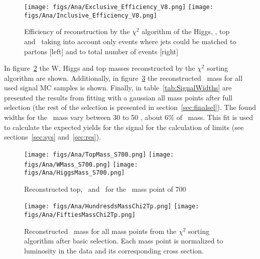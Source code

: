\begin{figure}[!Hhtbp]
  \begin{center}
    \texttt{[image: figs/Ana/Exclusive\_Efficiency\_V8.png]}
    \texttt{[image: figs/Ana/Inclusive\_Efficiency\_V8.png]}
    \caption{Efficiency of reconstruction by the $\chi^{2}$ algorithm of the Higgs, \W, top and \Tp~taking into account only events where jets could be matched to partons [left] and to total number of events [right]}
    \label{fig:RecEff}
  \end{center}
\end{figure}

In figure~\ref{fig:WHt} the W, Higgs and top masses reconstructed by the $\chi^{2}$ sorting algorithm are shown. Additionally, in figure~\ref{fig:RecT} the reconstructed \Tp~mass for all used signal MC samples is shown. Finally, in table~\ref{tab:SignalWidths} are presented the results from fitting with a gaussian all mass points after full selection (the rest of the selection is presented in section~\ref{sec:finalsel}). The found widths for the \Tp~mass vary between 30 to 50 \GeVcc, about 6\% of \Tp~mass. This fit is used to calculate the expected yields for the signal for the calculation of limits (see sections~\ref{sec:sys} and~\ref{sec:res}).

\begin{figure}[!Hhtbp]
  \begin{center}
    \texttt{[image: figs/Ana/TopMass\_S700.png]}
    \texttt{[image: figs/Ana/WMass\_S700.png]}
    \texttt{[image: figs/Ana/HiggsMass\_S700.png]}
    \caption{Reconstructed top, \W~and \Hb~for the \Tp~mass point of 700 \GeVcc}
    \label{fig:WHt}
  \end{center}
\end{figure}

\begin{figure}[!Hhtbp]
  \begin{center}
    \texttt{[image: figs/Ana/HundresdsMassChi2Tp.png]}
    \texttt{[image: figs/Ana/FiftiesMassChi2Tp.png]}
    \caption{Reconstructed \Tp~mass for all mass points from the $\chi^{2}$ sorting algorithm after basic selection. Each mass point is normalized to luminosity in the data and its corresponding cross section. }
    \label{fig:RecT}
  \end{center}
\end{figure}

